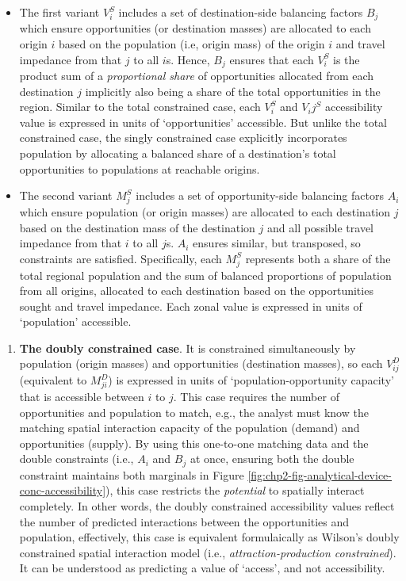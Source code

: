\documentclass[
11pt, %
oneside, %
english, %
singlespacing, %
]{macthesis} %
\def\tightlist{}
\begin{document}
\begin{itemize}
\tightlist
\item
  The first variant \(V_i^S\) includes a set of destination-side balancing factors \(B_j\) which ensure opportunities (or destination masses) are allocated to each origin \(i\) based on the population (i.e, origin mass) of the origin \(i\) and travel impedance from that \(j\) to all \(i\)s. Hence, \(B_j\) ensures that each \(V_i^S\) is the product sum of a \emph{proportional share} of opportunities allocated from each destination \(j\) implicitly also being a share of the total opportunities in the region. Similar to the total constrained case, each \(V_i^S\) and \(V_ij^S\) accessibility value is expressed in units of `opportunities' accessible. But unlike the total constrained case, the singly constrained case explicitly incorporates population by allocating a balanced share of a destination's total opportunities to populations at reachable origins.
\item
  The second variant \(M_j^S\) includes a set of opportunity-side balancing factors \(A_i\) which ensure population (or origin masses) are allocated to each destination \(j\) based on the destination mass of the destination \(j\) and all possible travel impedance from that \(i\) to all \(j\)s. \(A_i\) ensures similar, but transposed, so constraints are satisfied. Specifically, each \(M_j^S\) represents both a share of the total regional population and the sum of balanced proportions of population from all origins, allocated to each destination based on the opportunities sought and travel impedance. Each zonal value is expressed in units of `population' accessible.
\end{itemize}

\begin{enumerate}
\def\labelenumi{\arabic{enumi}.}
\setcounter{enumi}{3}
\tightlist
\item
  \textbf{The doubly constrained case}. It is constrained simultaneously by population (origin masses) and opportunities (destination masses), so each \(V_{ij}^D\) (equivalent to \(M_{ji}^D\)) is expressed in units of `population-opportunity capacity' that is accessible between \(i\) to \(j\). This case requires the number of opportunities and population to match, e.g., the analyst must know the matching spatial interaction capacity of the population (demand) and opportunities (supply). By using this one-to-one matching data and the double constraints (i.e., \(A_i\) and \(B_j\) at once, ensuring both the double constraint maintains both marginals in Figure \ref{fig:chp2-fig-analytical-device-conc-accessibility}), this case restricts the \emph{potential} to spatially interact completely. In other words, the doubly constrained accessibility values reflect the number of predicted interactions between the opportunities and population, effectively, this case is equivalent formulaically as Wilson's doubly constrained spatial interaction model (i.e., \emph{attraction-production constrained}). It can be understood as predicting a value of `access', and not accessibility.
\end{enumerate}
\end{document}
